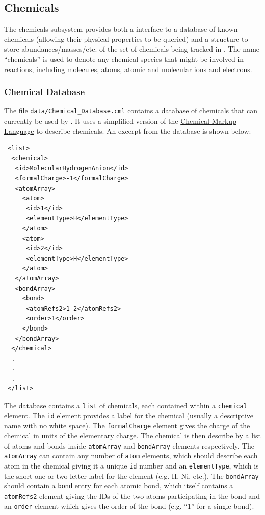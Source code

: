 \subsection{Chemicals}\label{sec:ChemicalSubsystem}

The chemicals subsystem provides both a interface to a database of known chemicals (allowing their physical properties to be queried) and a structure to store abundances/masses/etc. of the set of chemicals being tracked in \glc. The name ``chemicals'' is used to denote any chemical species that might be involved in reactions, including molecules, atoms, atomic and molecular ions and electrons.

\subsubsection{Chemical Database}

The file {\tt data/Chemical\_Database.cml} contains a database of chemicals that can currently be used by \glc. It uses a simplified version of the \href{http://www.xml-cml.org}{Chemical Markup Language} to describe chemicals. An excerpt from the database is shown below:
\begin{verbatim}
 <list>
  <chemical>
   <id>MolecularHydrogenAnion</id>
   <formalCharge>-1</formalCharge>
   <atomArray>
     <atom>
      <id>1</id>
      <elementType>H</elementType>
     </atom>
     <atom>
      <id>2</id>
      <elementType>H</elementType>
     </atom>
   </atomArray>
   <bondArray>
     <bond>
      <atomRefs2>1 2</atomRefs2>
      <order>1</order>
     </bond>
   </bondArray>
  </chemical>
  .
  .
  .
 </list>
\end{verbatim}
The database contains a {\tt list} of chemicals, each contained within a {\tt chemical} element. The {\tt id} element provides a label for the chemical (usually a descriptive name with no white space). The {\tt formalCharge} element gives the charge of the chemical in units of the elementary charge. The chemical is then describe by a list of atoms and bonds inside {\tt atomArray} and {\tt bondArray} elements respectively. The {\tt atomArray} can contain any number of {\tt atom} elements, which should describe each atom in the chemical giving it a unique {\tt id} number and an {\tt elementType}, which is the short one or two letter label for the element (e.g. H, Ni, etc.). The {\tt bondArray} should contain a {\tt bond} entry for each atomic bond, which itself contains a {\tt atomRefs2} element giving the IDs of the two atoms participating in the bond and an {\tt order} element which gives the order of the bond (e.g. ``1'' for a single bond).

